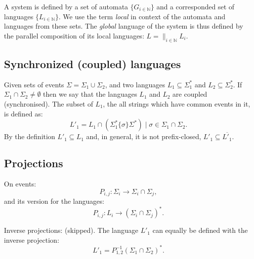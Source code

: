 \documentclass[a4paper, 10pt, conference]{ieeeconf} \IEEEoverridecommandlockouts
\begin{document}
A system is defined by a set of automata $\{G_{i \in \mathbb{N}}\}$ and a
corresponded set of languages $\{L_{i \in \mathbb{N}}\}$. We use the term
\emph{local} in context of the automata and languages from these sets. The
\emph{global} language of the system is thus defined by the parallel
composition of its local languages: $L = \parallel_{i \in \mathbb{N}} L_i$.

\subsection{Synchronized (coupled) languages}
Given sets of events $\Sigma = \Sigma_1 \cup \Sigma_2$, and
two languages $L_1 \subseteq \Sigma_1^*$ and $L_2 \subseteq \Sigma_2^*$.
If $\Sigma_1 \cap \Sigma_2 \neq \emptyset$ then we say that the languages $L_1$ and
$L_2$ are coupled (synchronised). The subset of $L_1$, the all strings which
have common events in it, is defined as:
\begin{equation}
\label{eq_synchronized_language}
L'_{1} =
	L_1 \cap \left( \Sigma_1^* \{\sigma\} \Sigma^* \right) 
	\mid \sigma \in \Sigma_1 \cap \Sigma_2.
\end{equation}
By the definition $L'_1 \subseteq L_1$ and, in general, it is not
prefix-closed, $L'_1 \subseteq \overline{L'_1}$.

\subsection{Projections} On events:
\label{sec:projections}
$$P_{i,j} : \Sigma_i \rightarrow \Sigma_i \cap \Sigma_j,$$
and its version for the languages: 
$$P_{i,j} : L_i \rightarrow (\Sigma_i \cap \Sigma_j)^*.$$

Inverse projections: (skipped). 
The language $L'_1$ can equally be defined with the inverse projection:
$$
L'_1 = P^{-1}_{1,2}(\Sigma_1 \cap \Sigma_2)^*.
$$
\end{document}
